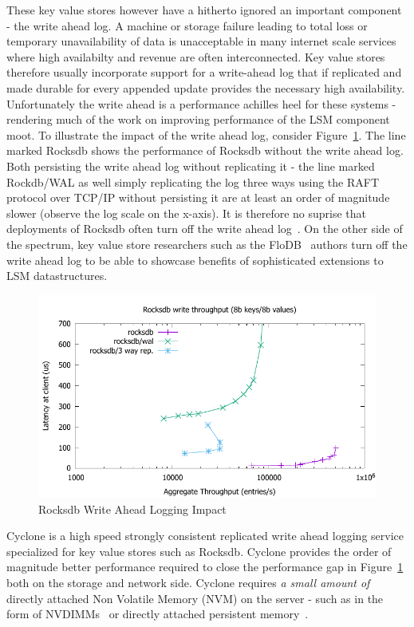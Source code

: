 \documentclass[10pt, preprint, nonatbib]{sigplanconf}
\begin{document}
These key value stores however have a hitherto ignored an important component -
the write ahead log. A machine or storage failure leading to total loss or
temporary unavailability of data is unacceptable in many internet scale services
where high availabilty and revenue are often interconnected. Key value stores
therefore usually incorporate support for a write-ahead log that if replicated
and made durable for every appended update provides the necessary high
availability. Unfortunately the write ahead is a performance achilles heel for
these systems - rendering much of the work on improving performance of the LSM
component moot. To illustrate the impact of the write ahead log, consider
Figure~\ref{fig:problem}. The line marked Rocksdb shows the performance of
Rocksdb without the write ahead log. Both persisting the write ahead log without
replicating it - the line marked Rockdb/WAL as well simply replicating the log
three ways using the RAFT~\cite{raft} protocol over TCP/IP without persisting it
are at least an order of magnitude slower (observe the log scale on the
x-axis). It is therefore no suprise that deployments of Rocksdb often turn off
the write ahead log~\cite{samza}. On the other side of the spectrum, key value
store researchers such as the FloDB~\cite{flodb} authors turn off the write
ahead log to be able to showcase benefits of sophisticated extensions to LSM
datastructures.

\begin{figure}
\centering
\includegraphics[scale=0.6]{results2/problem.pdf}
\caption{Rocksdb Write Ahead Logging Impact}
\label{fig:problem}
\end{figure}


Cyclone is a high speed strongly consistent replicated write ahead logging
service specialized for key value stores such as Rocksdb. Cyclone provides the
order of magnitude better performance required to close the performance gap in
Figure~\ref{fig:problem} both on the storage and network side. Cyclone requires
\emph{a small amount of} directly attached Non Volatile Memory (NVM) on the
server - such as in the form of NVDIMMs~\cite{farm} or directly attached
persistent memory~\cite{pmfs}.
\end{document}
